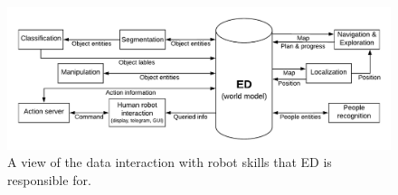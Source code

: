 \begin{figure}[H]
	\centering
	\vspace{-0.5cm}
	\includegraphics[width=\linewidth]{Figures/overview_subsystems}
	\vspace{-0.5em}
	\caption{A view of the data interaction with robot skills that ED is responsible for.}
	\label{fig:sub_overview}
	\vspace{-0.4cm}
\end{figure}
